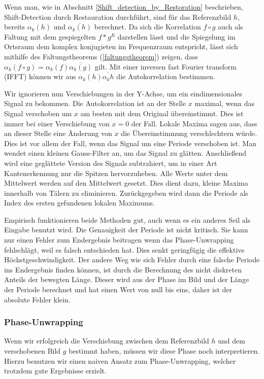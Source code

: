 \documentclass[10pt,a4paper]{scrarticle}
\begin{document}
		Wenn man, wie in Abschnitt \ref{Shift_detection_by_Restoration} beschrieben, Shift-Detection durch Restauration durchführt, sind für das Referenzbild $h$, bereits $\alpha_k(h)$ und $\overline{\alpha_k(h)}$ berechnet. Da sich die Korrelation $f\circ g$ auch als Faltung mit dem gespiegelten $f*g^R$ darstellen lässt und die Spiegelung im Ortsraum dem komplex konjugieten im Frequenzraum entspricht, lässt sich mithilfe des Faltungstheorems (\ref{faltungstheorem}) zeigen, dass $\alpha_k(f\circ g)=\alpha_k(f)\overline{\alpha_k(g)}$ gilt. 
		Mit einer inversen fast Fourier transform (IFFT) können wir aus $\alpha_k(h)\overline{\alpha_k{h}}$ die Autokorrelation bestimmen.
		
		Wir ignorieren nun Verschiebungen in der Y-Achse, um ein eindimensionales Signal zu bekommen. Die Autokorrelation ist an der Stelle $x$ maximal, wenn das Signal verschoben um $x$ am besten mit dem Original übereinstimmt. Dies ist immer bei einer Verschiebung von $x=0$ der Fall. Lokale Maxima sagen aus, dass an dieser Stelle eine Änderung von $x$ die Übereinstimmung verschlechtern würde. Dies ist vor allem der Fall, wenn das Signal um eine Periode verschoben ist.
		Man wendet einen kleinen Gauss-Filter an, um das Signal zu glätten. Anschließend wird eine geglättete Version des Signals subtrahiert, um in einer Art Kantenerkennung nur die Spitzen hervorzuheben. Alle Werte unter dem Mittelwert werden auf den Mittelwert gesetzt. Dies dient dazu, kleine Maxima innerhalb von Tälern zu eliminieren. Zurückgegeben wird dann die Periode als Index des ersten gefundenen lokalen Maximums.
		
        Empirisch funktionieren beide Methoden gut, auch wenn es ein anderes Seil als Eingabe benutzt wird. Die Genauigkeit der Periode ist nicht kritisch. Sie kann nur einen Fehler zum Endergebnis beitragen wenn das Phase-Unwrapping fehlschlägt, weil es falsch entschieden hat. Dies senkt geringfügig die effektive Höchstgeschwindigkeit. Der andere Weg wie sich Fehler durch eine falsche Periode ins Endergebnis finden können, ist durch die Berechnung des nicht diskreten Anteils der bewegten Länge. Dieser wird aus der Phase im Bild und der Länge der Periode berechnet und hat einen Wert von null bis eins, daher ist der absolute Fehler klein.
		
		
		\subsubsection{Phase-Unwrapping}
        Wenn wir erfolgreich die Verschiebung zwischen dem Referenzbild $h$ und dem verschobenen Bild $g$ bestimmt haben, müssen wir diese Phase noch interpretieren. Hierzu benutzen wir einen naiven Ansatz zum Phase-Unwrapping, welcher trotzdem gute Ergebnisse erzielt.
        
\end{document}
